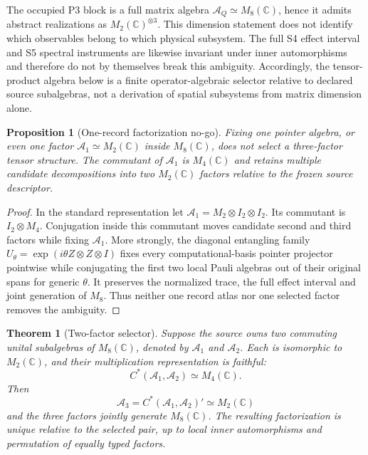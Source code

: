 \documentclass[11pt]{article}
\newtheorem{proposition}{Proposition}
\newtheorem{theorem}{Theorem}
\begin{document}
The occupied P3 block is a full matrix algebra
$\mathcal A_Q\simeq M_8(\mathbb C)$, hence it admits abstract realizations as
$M_2(\mathbb C)^{\otimes3}$. This dimension statement does not identify
which observables belong to which physical subsystem. The full S4 effect
interval and S5 spectral instruments are likewise invariant under inner
automorphisms and therefore do not by themselves break this ambiguity.
Accordingly, the tensor-product algebra below is a finite operator-algebraic
selector relative to declared source subalgebras, not a derivation of spatial
subsystems from matrix dimension alone.

\begin{proposition}[One-record factorization no-go]
\label{prop:factorizationnogo}
Fixing one pointer algebra, or even one factor
$\mathcal A_1\simeq M_2(\mathbb C)$ inside $M_8(\mathbb C)$, does not select a
three-factor tensor structure. The commutant of $\mathcal A_1$ is
$M_4(\mathbb C)$ and retains multiple candidate decompositions into two
$M_2(\mathbb C)$ factors relative to the frozen source descriptor.
\end{proposition}

\begin{proof}
In the standard representation let
$\mathcal A_1=M_2\otimes I_2\otimes I_2$. Its commutant is
$I_2\otimes M_4$. Conjugation inside this commutant moves candidate second
and third factors while fixing $\mathcal A_1$. More strongly, the diagonal
entangling family
$U_\theta=\exp(i\theta Z\otimes Z\otimes I)$ fixes every computational-basis
pointer projector pointwise while conjugating the first two local Pauli
algebras out of their original spans for generic $\theta$. It preserves the
normalized trace, the full effect interval and joint generation of $M_8$.
Thus neither one record atlas nor one selected factor removes the ambiguity.
\end{proof}

\begin{theorem}[Two-factor selector]
\label{thm:twofactorselector}
Suppose the source owns two commuting unital subalgebras of
$M_8(\mathbb C)$, denoted by $\mathcal A_1$ and $\mathcal A_2$.  Each is
isomorphic to $M_2(\mathbb C)$, and their multiplication representation is
faithful:
\begin{equation}
 C^*(\mathcal A_1,\mathcal A_2)\simeq M_4(\mathbb C).
\end{equation}
Then
\begin{equation}
 \mathcal A_3=C^*(\mathcal A_1,\mathcal A_2)'\simeq M_2(\mathbb C)
 \label{eq:thirdcommutant}
\end{equation}
and the three factors jointly generate $M_8(\mathbb C)$. The resulting
factorization is unique relative to the selected pair, up to local inner
automorphisms and permutation of equally typed factors.
\end{theorem}
\end{document}
